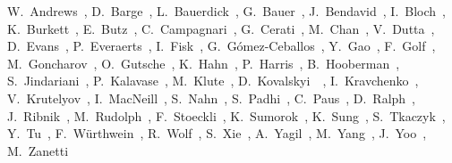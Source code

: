 \begin{Authlist}
%
W.~Andrews~, 
D.~Barge~, 
L.~Bauerdick~, 
G.~Bauer~,
J.~Bendavid~,
I.~Bloch~, 
K.~Burkett~, 
E.~Butz~,
C.~Campagnari~, 
G.~Cerati~,
M.~Chan~,
V.~Dutta~,
D.~Evans~, 
P.~Everaerts~,
I.~Fisk~, 
G.~G\'omez-Ceballos~,
Y.~Gao~, 
F.~Golf~, 
M.~Goncharov~,
O.~Gutsche~, 
K.~Hahn~,
P.~Harris~,
B.~Hooberman~,
S.~Jindariani~,
P.~Kalavase~, 
M.~Klute~,
D.~Kovalskyi~~, 
I.~Kravchenko~,
V.~Krutelyov~, 
I.~MacNeill~,
S.~Nahn~,
S.~Padhi~, 
C.~Paus~,
D.~Ralph~,
J.~Ribnik~,
M.~Rudolph~,
F.~Stoeckli~,
K.~Sumorok~,
K.~Sung~,
S.~Tkaczyk~,
Y.~Tu~, 
F.~W\"urthwein~, 
R.~Wolf~,
S.~Xie~,
A.~Yagil~, 
M.~Yang~,
J.~Yoo~,
M.~Zanetti~
%
\end{Authlist}
